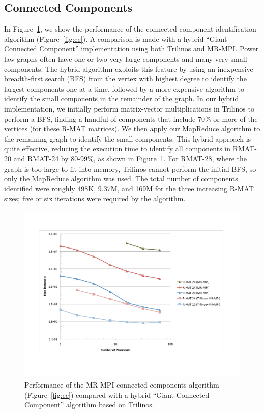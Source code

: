\subsection{Connected Components}

In Figure~\ref{f:cc}, we show the performance of the connected
component identification algorithm (Figure~\ref{fig:cc}).  A
comparison is made with a hybrid ``Giant Connected Component''
implementation using both Trilinos and MR-MPI.  Power law graphs often
have one or two very large components and many very small components.
The hybrid algorithm exploits this feature by using an inexpensive
breadth-first search (BFS) from the vertex with highest degree to
identify the largest components one at a time, followed by a more
expensive algorithm to identify the small components in the remainder
of the graph.  In our hybrid implementation, we initially perform
matrix-vector multiplications in Trilinos to perform a BFS, finding a
handful of components that include 70\% or more of the vertices (for
these R-MAT matrices).  We then apply our MapReduce algorithm to the
remaining graph to identify the small components.  This hybrid
approach is quite effective, reducing the execution time to identify
all components in RMAT-20 and RMAT-24 by 80-99\%, as shown in
Figure~\ref{f:cc}.  For RMAT-28, where the graph is too large to fit
into memory, Trilinos cannot perform the initial BFS, so only the
MapReduce algorithm was used.  The total number of components
identified were roughly 498K, 9.37M, and 169M for the three increasing
R-MAT sizes; five or six iterations were required by the algorithm.

\begin{figure}[htb]
\includegraphics[width=\textwidth]{fig_cc.pdf}
\caption{Performance of the MR-MPI connected components algorithm (Figure~\ref{fig:cc}) compared with a hybrid ``Giant Connected Component'' algorithm based
on Trilinos.}
\label{f:cc}
\end{figure}

